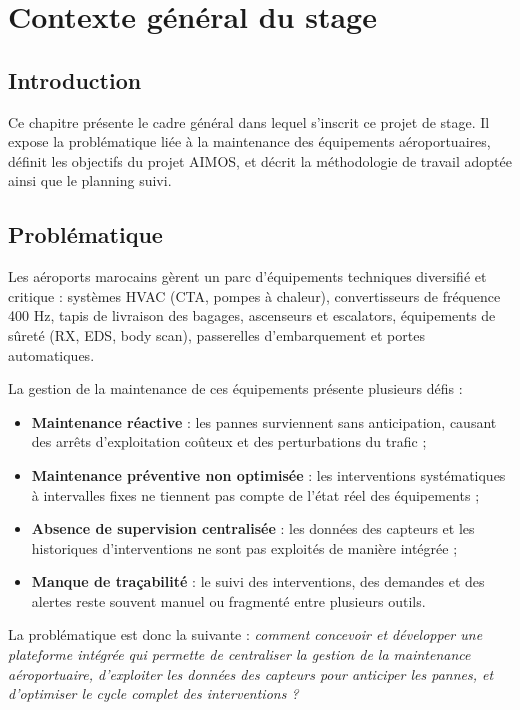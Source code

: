 \chapter{Contexte général du stage}

\section{Introduction}
Ce chapitre présente le cadre général dans lequel s'inscrit ce projet de stage. Il expose la problématique liée à la maintenance des équipements aéroportuaires, définit les objectifs du projet AIMOS, et décrit la méthodologie de travail adoptée ainsi que le planning suivi.

\section{Problématique}
Les aéroports marocains gèrent un parc d'équipements techniques diversifié et critique : systèmes HVAC (CTA, pompes à chaleur), convertisseurs de fréquence 400 Hz, tapis de livraison des bagages, ascenseurs et escalators, équipements de sûreté (RX, EDS, body scan), passerelles d'embarquement et portes automatiques.

La gestion de la maintenance de ces équipements présente plusieurs défis :
\begin{itemize}
    \item \textbf{Maintenance réactive} : les pannes surviennent sans anticipation, causant des arrêts d'exploitation coûteux et des perturbations du trafic ;
    \item \textbf{Maintenance préventive non optimisée} : les interventions systématiques à intervalles fixes ne tiennent pas compte de l'état réel des équipements ;
    \item \textbf{Absence de supervision centralisée} : les données des capteurs et les historiques d'interventions ne sont pas exploités de manière intégrée ;
    \item \textbf{Manque de traçabilité} : le suivi des interventions, des demandes et des alertes reste souvent manuel ou fragmenté entre plusieurs outils.
\end{itemize}

La problématique est donc la suivante : \textit{comment concevoir et développer une plateforme intégrée qui permette de centraliser la gestion de la maintenance aéroportuaire, d'exploiter les données des capteurs pour anticiper les pannes, et d'optimiser le cycle complet des interventions ?}

